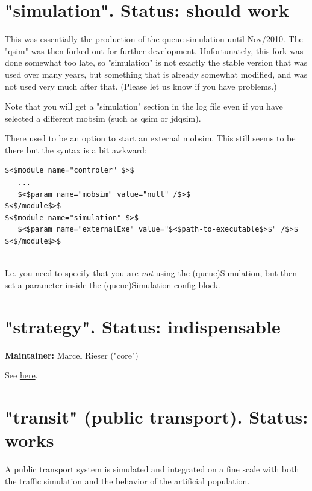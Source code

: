 
\vfill\eject
\section{"simulation". Status: should work}

This  was essentially the production of the queue simulation until Nov/2010.  The "qsim" was then forked out for further development. Unfortunately,  this fork was done somewhat too late, so "simulation" is not exactly the  stable version that was used over many years, but something that is  already somewhat modified, and was not used very much after that.  (Please let us know if you have problems.)

Note that you will get a "simulation" section in the log file even if  you have selected a different mobsim (such as qsim or jdqsim).

There used to be an option to start an external mobsim. This still seems to be there but the syntax is a bit awkward:
\begin{verbatim}
$<$module name="controler" $>$
   ...
   $<$param name="mobsim" value="null" /$>$
$<$/module$>$
$<$module name="simulation" $>$
   $<$param name="externalExe" value="$<$path-to-executable$>$" /$>$
$<$/module$>$


\end{verbatim}

I.e. you need to specify that you are \emph{not} using the (queue)Simulation, but then set a parameter inside the (queue)Simulation config block.

\vfill\eject
\section{"strategy". Status: indispensable}

\textbf{Maintainer:} Marcel Rieser ("core")

See \href{http://matsim.org/node/478}{here}.

\vfill\eject
\section{"transit" (public transport).  Status: works}

A  public transport system is simulated and integrated on a fine scale  with both the traffic simulation and the behavior of the artificial  population.

